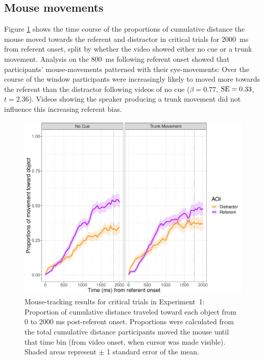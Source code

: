 \documentclass[a4paper,man,natbib]{apa6}
\newcommand{\resultsLM}[3]{$\beta = #1$, $\textnormal{SE} = #2$, $t #3$}
\begin{document}
\subsection{Mouse movements}
Figure \ref{fig:v1_mouse1} shows the time course of the proportions of cumulative distance the mouse moved towards the referent and distractor in critical trials for 2000~ms from referent onset, split by whether the video showed either no cue or a trunk movement.
Analysis on the 800~ms following referent onset showed that participants' mouse-movements patterned with their eye-movements:
Over the course of the window participants were increasingly likely to moved more towards the referent than the distractor following videos of no cue (\resultsLM{0.77}{0.33}{=2.36}). 
Videos showing the speaker producing a trunk movement did not influence this increasing referent bias.


\begin{figure}[Ht]
  \centering
	\includegraphics[width=\linewidth]{./img/e7_mouse_crit.pdf}
  \caption{Mouse-tracking results for critical trials in Experiment~1: Proportion of cumulative distance traveled toward each object from 0 to 2000 ms post-referent onset. Proportions were calculated from the total cumulative distance participants moved the mouse until that time bin (from video onset, when cursor was made visible). Shaded areas represent $\pm$ 1 standard error of the mean.}
  \label{fig:v1_mouse1}
\end{figure}
\end{document}
